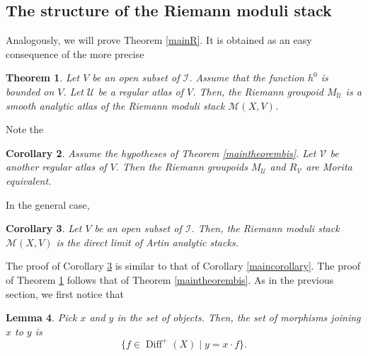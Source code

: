 \documentclass[10pt]{amsart}
\let\mathcal\mathscr
\DeclareMathOperator{\Diff}{Diff}
\theoremstyle{plain}
\newtheorem{theorem}{Theorem}[section]
\newtheorem{corollary}[theorem]{Corollary}
\newtheorem{lemma}[theorem]{Lemma}
\theoremstyle{definition}
\theoremstyle{remark}
\numberwithin{equation}{section}
\newcommand{\cI}{\mathcal{I}}
\begin{document}
\subsection{The structure of the Riemann moduli stack}
\label{mainRiemann}
Analogously, we will prove Theorem \ref{mainR}. It is obtained as an easy consequence of the more precise

\begin{theorem}
\label{mainRbis}
Let $V$ be an open subset of $\cI$. Assume that the function $h^0$ is bounded on $V$. Let $\mathcal U$ be a regular atlas of $V$. Then, the Riemann groupoid $M_{\mathcal U}$ is a smooth analytic atlas of the Riemann moduli stack $\mathcal M(X,V)$.
\end{theorem}

Note the
\begin{corollary}
\label{RiemMoritaind}
Assume the hypotheses of Theorem \ref{maintheorembis}. Let $\mathcal V$ be another regular atlas of $V$. Then the Riemann groupoids $M_{\mathcal U}$ and $R_\mathcal V$ are Morita equivalent.
\end{corollary}

In the general case,

\begin{corollary}
\label{maincorollaryR}
Let $V$ be an open subset of $\cI$. Then, the Riemann moduli stack $\mathcal M(X,V)$ is the direct limit of Artin analytic stacks.
\end{corollary}

The proof of Corollary \ref{maincorollaryR} is similar to that of Corollary \ref{maincorollary}. The proof of Theorem \ref{mainRbis} follows that of Theorem \ref{maintheorembis}.
As in the previous section, we first notice that

\begin{lemma}
\label{morphismsxyR}
Pick $x$ and $y$ in the set of objects. Then, the set of morphisms joining $x$ to $y$ is
\begin{equation}
\label{morxyR}
\{f\in\Diff^+(X)\mid y=x\cdot f\}.
\end{equation}
\end{lemma}
\end{document}
